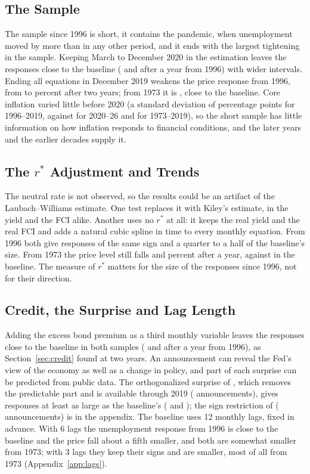 \documentclass[11pt]{article}
\newcommand{\rs}{r^{*}}
\begin{document}
\subsection{The Sample}\label{sec:recent}
The sample since 1996 is short, it contains the pandemic, when unemployment moved by more than in any other period, and it ends with the largest tightening in the sample. Keeping March to December 2020 in the estimation leaves the responses close to the baseline ( and  after a year from 1996) with wider intervals. Ending all equations in December 2019 weakens the price response from 1996, from  to  percent after two years; from 1973 it is , close to the baseline. Core inflation varied little before 2020 (a standard deviation of  percentage points for 1996--2019, against  for 2020--26 and  for 1973--2019), so the short sample has little information on how inflation responds to financial conditions, and the later years and the earlier decades supply it.

\subsection{The $r^*$ Adjustment and Trends}\label{sec:rstarrob}
The neutral rate is not observed, so the results could be an artifact of the Laubach--Williams estimate. One test replaces it with Kiley's estimate, in the yield and the FCI alike. Another uses no $\rs$ at all: it keeps the real yield and the real FCI and adds a natural cubic spline in time to every monthly equation. From 1996 both give responses of the same sign and a quarter to a half of the baseline's size. From 1973 the price level still falls  and  percent after a year, against  in the baseline. The measure of $\rs$ matters for the size of the responses since 1996, not for their direction.

\subsection{Credit, the Surprise and Lag Length}\label{sec:surprise}
Adding the excess bond premium as a third monthly variable leaves the responses close to the baseline in both samples ( and  after a year from 1996), as Section~\ref{sec:credit} found at two years. An announcement can reveal the Fed's view of the economy as well as a change in policy, and part of each surprise can be predicted from public data. The orthogonalized surprise of \citet{bauer2023}, which removes the predictable part and is available through 2019 ( announcements), gives responses at least as large as the baseline's ( and ); the sign restriction of \citet{jarocinski2020} ( announcements) is in the appendix. The baseline uses 12 monthly lags, fixed in advance. With 6 lags the unemployment response from 1996 is close to the baseline and the price fall about a fifth smaller, and both are somewhat smaller from 1973; with 3 lags they keep their signs and are smaller, most of all from 1973 (Appendix~\ref{app:lags}).
\end{document}
